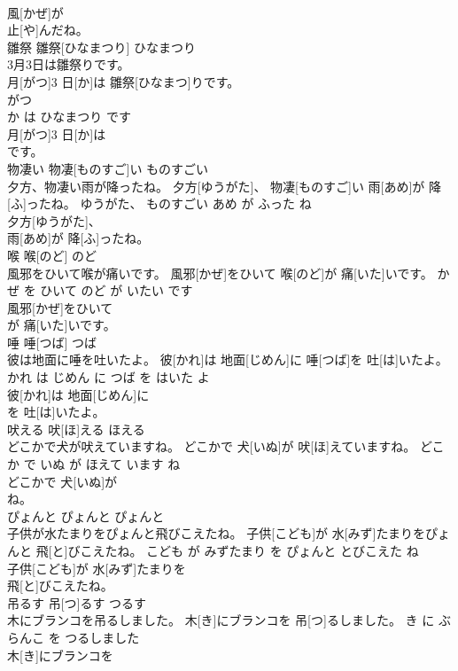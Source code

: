 \documentclass[8pt]{extreport}
\begin{document}
\begin{CJK}{UTF8}{min}
\\	風[かぜ]が
\\	止[や]んだね。			
\\	雛祭	雛祭[ひなまつり]	ひなまつり	
\\	3月3日は雛祭りです。	
\\	月[がつ]3 日[か]は 雛祭[ひなまつ]りです。	
\\	がつ 
\\	か は ひなまつり です	
\\	月[がつ]3 日[か]は
\\	です。			
\\	物凄い	物凄[ものすご]い	ものすごい	
\\	夕方、物凄い雨が降ったね。	夕方[ゆうがた]、 物凄[ものすご]い 雨[あめ]が 降[ふ]ったね。	ゆうがた、 ものすごい あめ が ふった ね	
\\	夕方[ゆうがた]、
\\	雨[あめ]が 降[ふ]ったね。			
\\	喉	喉[のど]	のど	
\\	風邪をひいて喉が痛いです。	風邪[かぜ]をひいて 喉[のど]が 痛[いた]いです。	かぜ を ひいて のど が いたい です	
\\	風邪[かぜ]をひいて
\\	が 痛[いた]いです。			
\\	唾	唾[つば]	つば	
\\	彼は地面に唾を吐いたよ。	彼[かれ]は 地面[じめん]に 唾[つば]を 吐[は]いたよ。	かれ は じめん に つば を はいた よ	
\\	彼[かれ]は 地面[じめん]に
\\	を 吐[は]いたよ。			
\\	吠える	吠[ほ]える	ほえる	
\\	どこかで犬が吠えていますね。	どこかで 犬[いぬ]が 吠[ほ]えていますね。	どこか で いぬ が ほえて います ね	
\\	どこかで 犬[いぬ]が
\\	ね。			
\\	ぴょんと	ぴょんと	ぴょんと	
\\	子供が水たまりをぴょんと飛びこえたね。	子供[こども]が 水[みず]たまりをぴょんと 飛[と]びこえたね。	こども が みずたまり を ぴょんと とびこえた ね	
\\	子供[こども]が 水[みず]たまりを
\\	飛[と]びこえたね。			
\\	吊るす	吊[つ]るす	つるす	
\\	木にブランコを吊るしました。	木[き]にブランコを 吊[つ]るしました。	き に ぶらんこ を つるしました	
\\	木[き]にブランコを

\end{CJK}
\end{document}
